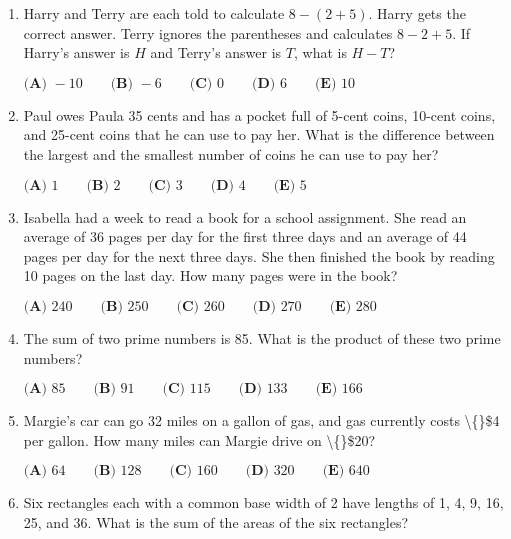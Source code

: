 \documentclass{article}
\begin{document}
\begin{enumerate}[label=\arabic*., itemsep=0.5em]\item Harry and Terry are each told to calculate \(8 - (2 + 5)\). Harry gets the correct answer. Terry ignores the parentheses and calculates \(8 - 2 + 5\). If Harry's answer is \(H\) and Terry's answer is \(T\), what is \(H - T\)?

\(\textbf{(A) }-10\qquad\textbf{(B) }-6\qquad\textbf{(C) }0\qquad\textbf{(D) }6\qquad \textbf{(E) }10\)\par \vspace{0.5em}\item Paul owes Paula 35 cents and has a pocket full of 5-cent coins, 10-cent coins, and 25-cent coins that he can use to pay her. What is the difference between the largest and the smallest number of coins he can use to pay her?

\(\textbf{(A) }1\qquad\textbf{(B) }2\qquad\textbf{(C) }3\qquad\textbf{(D) }4\qquad \textbf{(E) }5\)\par \vspace{0.5em}\item Isabella had a week to read a book for a school assignment. She read an average of 36 pages per day for the first three days and an average of 44 pages per day for the next three days. She then finished the book by reading 10 pages on the last day. How many pages were in the book?

\(\textbf{(A) }240\qquad\textbf{(B) }250\qquad\textbf{(C) }260\qquad\textbf{(D) }270\qquad \textbf{(E) }280\)\par \vspace{0.5em}\item The sum of two prime numbers is 85. What is the product of these two prime numbers?

\(\textbf{(A) }85\qquad\textbf{(B) }91\qquad\textbf{(C) }115\qquad\textbf{(D) }133\qquad \textbf{(E) }166\)\par \vspace{0.5em}\item Margie's car can go 32 miles on a gallon of gas, and gas currently costs \textbackslash\{\}\$4 per gallon. How many miles can Margie drive on \textbackslash\{\}\$20?

\( \textbf{(A) }64\qquad\textbf{(B) }128\qquad\textbf{(C) }160\qquad\textbf{(D) }320\qquad\textbf{(E) }640 \)\par \vspace{0.5em}\item Six rectangles each with a common base width of 2 have lengths of 1, 4, 9, 16, 25, and 36. What is the sum of the areas of the six rectangles?


\end{enumerate}
\end{document}
